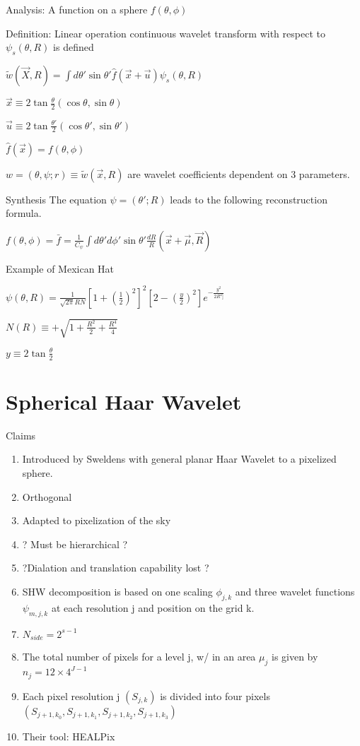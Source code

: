 \documentclass[11pt]{article}
\begin{document}
Analysis: A function on a sphere $f(\theta , \phi)$

Definition: Linear operation continuous wavelet transform with respect to $\psi_s (\theta, R)$ is defined 

$\tilde{w} (\vec{X}, R) = \int d\theta\prime \sin \theta\prime \hat{f}(\vec{x} + \vec{u}) \psi_s (\theta, R)$

$\vec{x} \equiv 2 \tan \frac{\theta}{2}(\cos\theta, \sin\theta) $

$\vec{u} \equiv 2 \tan \frac{\theta\prime}{2}(\cos\theta\prime, \sin\theta\prime) $

$\hat{f}(\vec{x}) = f(\theta, \phi)$

$w = (\theta , \psi; r) \equiv \tilde{w}(\vec{x},R)$ are wavelet coefficients dependent on 3 parameters.

Synthesis 
The equation $\psi = (\theta\prime;R)$ leads to the following reconstruction formula.

$f(\theta , \phi) = \bar{f} = \frac{1}{C_\psi} \int d\theta\prime d\phi\prime \sin\theta\prime \frac{dR}{R} (\vec{x} +\vec{\mu} , \vec{R} ) $

Example of Mexican Hat

$\psi (\theta, R) = \frac{1}{\sqrt{2\pi} RN} [1 + (\frac{1}{2})^2]^2 [2-(\frac{y}{2})^2]e^{-\frac{y^2}{2R^2]}}$

$N(R) \equiv +\sqrt{1 + \frac{R^2}{2} + \frac{R^4}{4}} $

$y \equiv 2\tan\frac{\theta}{2}$


\section {Spherical Haar Wavelet}
Claims 
\begin{enumerate}
\item Introduced by Sweldens with general planar Haar Wavelet to a pixelized sphere.
\item Orthogonal 
\item Adapted to pixelization of the sky 
\item ? Must be hierarchical ?
\item ?Dialation and translation capability lost ?
\item SHW decomposition is based on one scaling $\phi_{j,k}$ and three wavelet functions $\psi_{m,j,k}$ at each resolution j and position on the grid k. 
\item$ N_{side} =2^{s-1}$
\item The total number of pixels for a level j, w/ in an area $\mu_j$ is given by $n_j = 12 \times 4^{J-1}$
\item Each pixel resolution j $(S_{j,k})$ is divided into four pixels $(S_{j+1,k_0}, S_{j+1,k_1}, S_{j+1,k_2}, S_{j+1,k_3})$
\item Their tool: HEALPix
\end{enumerate}
\end{document}

